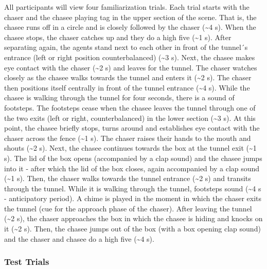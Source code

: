 \documentclass[
  man, donotrepeattitle,floatsintext]{apa6}
\begin{document}
All participants will view four familiarization trials. Each trial starts with the chaser and the chasee playing tag in the upper section of the scene. That is, the chasee runs off in a circle and is closely followed by the chaser (\textasciitilde4 s). When the chasee stops, the chaser catches up and they do a high five (\textasciitilde1 s). After separating again, the agents stand next to each other in front of the tunnel´s entrance (left or right position counterbalanced) (\textasciitilde3 s). Next, the chasee makes eye contact with the chaser (\textasciitilde2 s) and leaves for the tunnel. The chaser watches closely as the chasee walks towards the tunnel and enters it (\textasciitilde2 s). The chaser then positions itself centrally in front of the tunnel entrance (\textasciitilde4 s). While the chasee is walking through the tunnel for four seconds, there is a sound of footsteps. The footsteps cease when the chasee leaves the tunnel through one of the two exits (left or right, counterbalanced) in the lower section (\textasciitilde3 s). At this point, the chasee briefly stops, turns around and establishes eye contact with the chaser across the fence (\textasciitilde1 s). The chaser raises their hands to the mouth and shouts (\textasciitilde2 s). Next, the chasee continues towards the box at the tunnel exit (\textasciitilde1 s). The lid of the box opens (accompanied by a clap sound) and the chasee jumps into it - after which the lid of the box closes, again accompanied by a clap sound (\textasciitilde1 s). Then, the chaser walks towards the tunnel entrance (\textasciitilde2 s) and transits through the tunnel. While it is walking through the tunnel, footsteps sound (\textasciitilde4 s - anticipatory period). A chime is played in the moment in which the chaser exits the tunnel (cue for the approach phase of the chaser). After leaving the tunnel (\textasciitilde2 s), the chaser approaches the box in which the chasee is hiding and knocks on it (\textasciitilde2 s). Then, the chasee jumps out of the box (with a box opening clap sound) and the chaser and chasee do a high five (\textasciitilde4 s).

\subsubsection{Test Trials}\label{test-trials}
\end{document}
